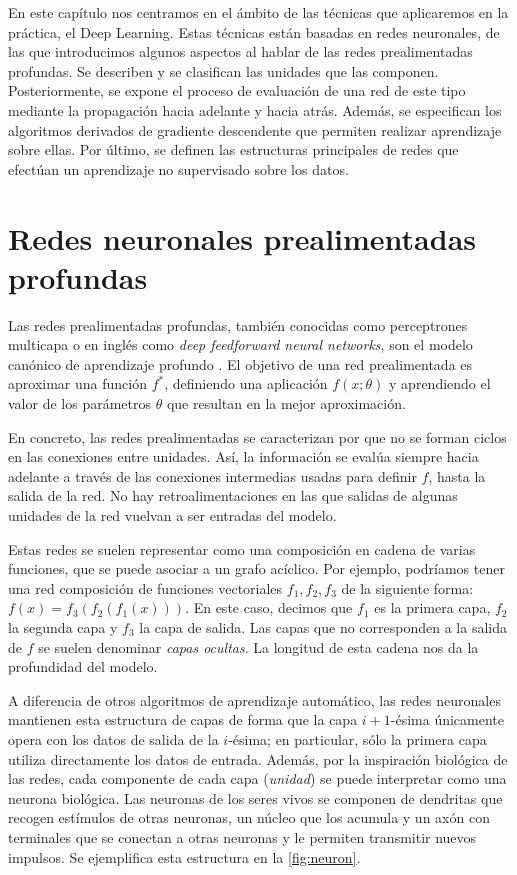 
En este capítulo nos centramos en el ámbito de las técnicas que aplicaremos
en la práctica, el Deep Learning. Estas técnicas están basadas en redes neuronales, de las que introducimos algunos aspectos al hablar de las redes prealimentadas profundas. Se describen y se clasifican las unidades que las componen. Posteriormente, se expone el proceso de evaluación de una red de este tipo mediante la propagación hacia adelante y hacia atrás. Además, se especifican los algoritmos derivados de gradiente descendente que permiten realizar aprendizaje sobre ellas. Por último, se definen las estructuras principales de redes que efectúan un aprendizaje no supervisado sobre los datos.

\section{Redes neuronales prealimentadas
profundas}\label{redes-neuronales-prealimentadas-profundas}

\label{sec:feedforward}

Las redes prealimentadas profundas, también conocidas como perceptrones
multicapa o en inglés como \emph{deep feedforward neural networks}, son
el modelo canónico de aprendizaje profundo \autocite{goodfellow2016}. El
objetivo de una red prealimentada es aproximar una función \(f^{*}\),
definiendo una aplicación \(f(x;\theta)\) y aprendiendo el valor de los
parámetros \(\theta\) que resultan en la mejor aproximación.

En concreto, las redes prealimentadas se caracterizan por que no se
forman ciclos en las conexiones entre unidades. Así, la información se
evalúa siempre hacia adelante a través de las conexiones intermedias
usadas para definir \(f\), hasta la salida de la red. No hay
retroalimentaciones en las que salidas de algunas unidades de la red
vuelvan a ser entradas del modelo.

Estas redes se suelen representar como una composición en cadena de
varias funciones, que se puede asociar a un grafo acíclico. Por ejemplo,
podríamos tener una red composición de funciones vectoriales
\(f_1, f_2, f_3\) de la siguiente forma: \(f(x)=f_3(f_2(f_1(x)))\). En
este caso, decimos que \(f_1\) es la primera capa, \(f_2\) la segunda
capa y \(f_3\) la capa de salida. Las capas que no corresponden a la
salida de \(f\) se suelen denominar \emph{capas ocultas}. La longitud de
esta cadena nos da la profundidad del modelo.

A diferencia de otros algoritmos de aprendizaje automático, las redes
neuronales mantienen esta estructura de capas de forma que la capa
\(i+1\)-ésima únicamente opera con los datos de salida de la
\(i\)-ésima; en particular, sólo la primera capa utiliza directamente
los datos de entrada. Además, por la inspiración biológica de las redes,
cada componente de cada capa (\emph{unidad}) se puede interpretar como
una neurona biológica. Las neuronas de los seres vivos se componen de dendritas que recogen estímulos de otras neuronas, un núcleo que los acumula y un axón con terminales que se conectan a otras neuronas y le permiten transmitir nuevos impulsos. Se ejemplifica esta estructura en la \autoref{fig:neuron}.

